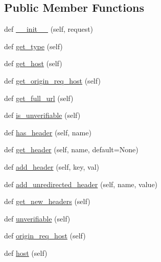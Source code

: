 \subsection*{Public Member Functions}
\begin{DoxyCompactItemize}
\item 
def \hyperlink{classpip_1_1__vendor_1_1requests_1_1cookies_1_1MockRequest_a6142d0899c92a07f524c3dd44a30cc4a}{\+\_\+\+\_\+init\+\_\+\+\_\+} (self, request)
\item 
def \hyperlink{classpip_1_1__vendor_1_1requests_1_1cookies_1_1MockRequest_a45ee56caa1653e08ef62fbcb0eed9f4d}{get\+\_\+type} (self)
\item 
def \hyperlink{classpip_1_1__vendor_1_1requests_1_1cookies_1_1MockRequest_af5ac0a64a81fc4fd738fbfa3b1221343}{get\+\_\+host} (self)
\item 
def \hyperlink{classpip_1_1__vendor_1_1requests_1_1cookies_1_1MockRequest_a5bb2cce3370c3a9a5f69097134114032}{get\+\_\+origin\+\_\+req\+\_\+host} (self)
\item 
def \hyperlink{classpip_1_1__vendor_1_1requests_1_1cookies_1_1MockRequest_a40a7da11e73776fae044c7b825ef96ac}{get\+\_\+full\+\_\+url} (self)
\item 
def \hyperlink{classpip_1_1__vendor_1_1requests_1_1cookies_1_1MockRequest_a52e39d2166e4abb8b07ce80bb1faf56f}{is\+\_\+unverifiable} (self)
\item 
def \hyperlink{classpip_1_1__vendor_1_1requests_1_1cookies_1_1MockRequest_aa324723c8e0879462aa9c5fb88a06829}{has\+\_\+header} (self, name)
\item 
def \hyperlink{classpip_1_1__vendor_1_1requests_1_1cookies_1_1MockRequest_a6f066ed32984f95380656d06a98bd307}{get\+\_\+header} (self, name, default=None)
\item 
def \hyperlink{classpip_1_1__vendor_1_1requests_1_1cookies_1_1MockRequest_ad39c402ac97aae9d784304260b308c45}{add\+\_\+header} (self, key, val)
\item 
def \hyperlink{classpip_1_1__vendor_1_1requests_1_1cookies_1_1MockRequest_a04e9926025d34d38e8959870ea751d83}{add\+\_\+unredirected\+\_\+header} (self, name, value)
\item 
def \hyperlink{classpip_1_1__vendor_1_1requests_1_1cookies_1_1MockRequest_a7c3ac5e7b77fcc39d30bcad4e0a027f6}{get\+\_\+new\+\_\+headers} (self)
\item 
def \hyperlink{classpip_1_1__vendor_1_1requests_1_1cookies_1_1MockRequest_a00a84f149b5856acb71d5e7040f397d3}{unverifiable} (self)
\item 
def \hyperlink{classpip_1_1__vendor_1_1requests_1_1cookies_1_1MockRequest_aa1e1851514e730426e6de59387ec5b3f}{origin\+\_\+req\+\_\+host} (self)
\item 
def \hyperlink{classpip_1_1__vendor_1_1requests_1_1cookies_1_1MockRequest_af4bb7159498fdef48e4ab6403e92d6d8}{host} (self)
\end{DoxyCompactItemize}
